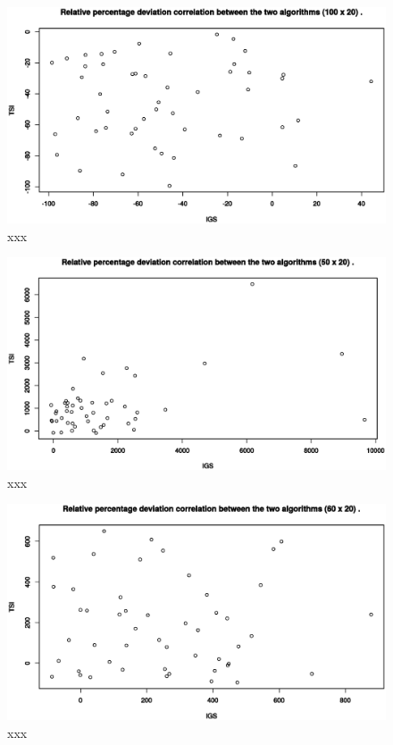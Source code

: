 

\begin{figure}[H]
	\centering
	\includegraphics[width=\textwidth]{fig/corr/100x20}
	\caption{xxx}
\end{figure}

\begin{figure}[H]
	\centering
	\includegraphics[width=\textwidth]{fig/corr/50x20}
	\caption{xxx}
\end{figure}

\begin{figure}[H]
	\centering
	\includegraphics[width=\textwidth]{fig/corr/60x20}
	\caption{xxx}
\end{figure}

